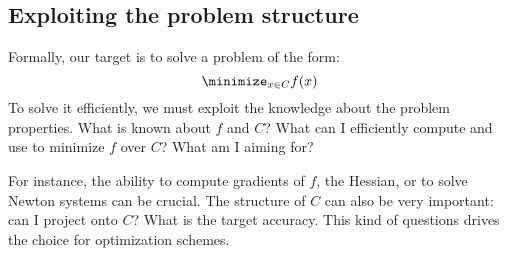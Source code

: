 \subsection{Exploiting the problem structure}
Formally, our target is to solve a problem of the form:
\begin{equation*}
    \minimize_{x\in C} f(x)
\end{equation*}
To solve it efficiently, we must exploit the knowledge about the problem properties. What is known about $f$ and $C$? What can I efficiently compute and use to minimize $f$ over $C$? What am I aiming for?

For instance, the ability to compute gradients of $f$, the Hessian, or to solve Newton systems can be crucial. The structure of $C$ can also be very important: can I project onto $C$? What is the target accuracy. This kind of questions drives the choice for optimization schemes.